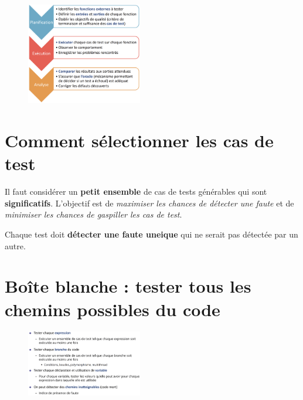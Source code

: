 \documentclass[16pt]{report}
\begin{document}
\begin{multicols*}{2}
        \begin{figure}[H]
        \begin{center}
            \includegraphics[width=0.45\textwidth]{strattest3.png}
        \end{center}
       \end{figure}


       \section{Comment sélectionner les cas de test}

       Il faut considérer un \textbf{petit ensemble} de cas de tests générables qui sont \textbf{significatifs}. 
       L'objectif est de \textit{maximiser les chances de détecter une faute} et de 
       \textit{minimiser les chances de gaspiller les cas de test}. 
       \begin{note}{}{}
           Chaque test doit \textbf{détecter une faute uneique} qui ne serait pas détectée par un autre. 
       \end{note}               


       \section{Boîte blanche : tester tous les chemins possibles du code} 



       \begin{figure}[H]
        \begin{center}
            \includegraphics[width=0.45\textwidth]{Stratblanche}
        \end{center}
       \end{figure}


\end{multicols*}
\end{document}
